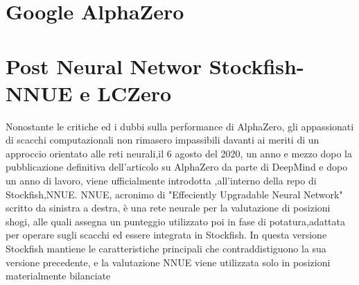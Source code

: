 \section{Google AlphaZero}



\section{Post Neural Networ Stockfish-NNUE e LCZero}
Nonostante le critiche ed i dubbi sulla performance di AlphaZero, gli appassionati di scacchi
computazionali non rimasero impassibili davanti ai meriti di un approccio orientato alle reti
neurali,il 6 agosto del 2020, un anno e mezzo dopo la pubblicazione definitiva dell'articolo su
AlphaZero da parte di DeepMind e dopo un anno di lavoro, viene ufficialmente introdotta 
,all'interno della repo di Stockfish,NNUE.
 NNUE, acronimo di "Effeciently Upgradable Neural Network" scritto da sinistra a destra,
è una rete neurale per la valutazione di posizioni shogi, alle quali assegna un punteggio
utilizzato poi in fase di potatura,adattata per operare sugli scacchi ed essere integrata in 
Stockfish.
In questa versione Stockfish mantiene le caratteristiche principali che contraddistiguono la sua 
versione precedente, e la valutazione NNUE viene utilizzata solo in posizioni materialmente bilanciate

